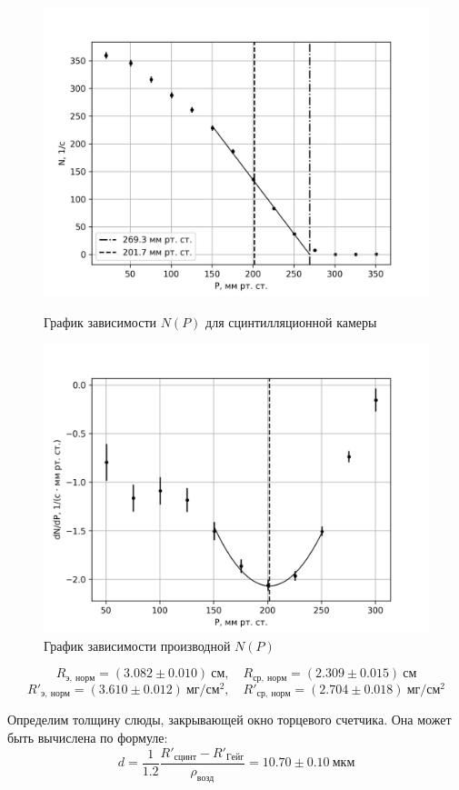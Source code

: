 \documentclass[14pt, a4paper]{report}
\begin{document}
\begin{figure}[H]
\centering
\begin{minipage}{.8\textwidth}
  \centering
  \includegraphics[width=.8\linewidth]{../images/541-5}
  \caption{График зависимости $N(P)$ для сцинтилляционной камеры}
\end{minipage}
\begin{minipage}{.8\textwidth}
  \centering
  \includegraphics[width=.8\linewidth]{../images/541-6}
  \caption{График зависимости производной $N(P)$}
\end{minipage}
\end{figure}

\[R_{э,\ норм}=(3.082\pm0.010)\ см,\quad R_{ср,\ норм}=(2.309\pm0.015)\ см\]
\[R'_{э,\ норм}=(3.610\pm0.012)\ мг/см^2,\quad R'_{ср,\ норм}=(2.704\pm0.018)\ мг/см^2\]

\newpage

Определим толщину слюды, закрывающей окно торцевого счетчика. Она может быть вычислена по формуле:
\[d=\frac{1}{1.2}\frac{R'_{сцинт}-R'_{Гейг}}{\rho_{возд}}=10.70\pm0.10\ мкм\]
\end{document}
